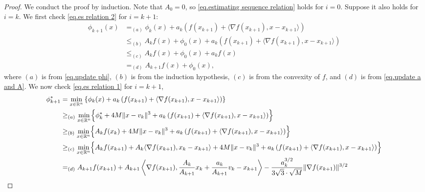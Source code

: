 \documentclass{article}
\begin{document}
\begin{proof}
    We conduct the proof by induction. Note that $A_0 = 0$, so \eqref{eq.estimating sequence relation} holds for $i=0$. Suppose it also holds for $i=k$.
    We first check \eqref{eq.es relation 2} for $i=k+1$:
    \begin{align*}
        \phi_{k+1}(x) & =_{(a)}\phi_k(x)+a_k\left(f(x_{k+1})+\langle \nabla f(x_{k+1}),x-x_{k+1}\rangle \right)               \\
                      & \leq_{(b)} A_k f(x)+\phi_0(x) +a_k\left(f(x_{k+1})+\langle \nabla f(x_{k+1}),x-x_{k+1}\rangle \right) \\
                      & \leq_{(c)} A_k f(x)+\phi_0(x) +a_k f(x)                                                               \\
                      & =_{(d)}A_{k+1} f(x)+\phi_0(x),
    \end{align*}
    where $(a)$ is from \eqref{eq.update phi}, $(b)$ is from the induction hypothesis, $(c)$ is from the convexity of $f$, and $(d)$ is from \eqref{eq.update a and A}.
    We now check \eqref{eq.es relation 1} for $i=k+1$,
    \begin{align*}
        \phi_{k+1}^*
         & = \min_{x\in\mathbb{R}^n} \left\{ \phi_k(x) + a_k \left(f(x_{k+1}) + \langle \nabla f(x_{k+1}), x - x_{k+1} \rangle \right) \right\}                                                                                        \\
         & \geq_{(a)} \min_{x\in\mathbb{R}^n} \Bigl\{ \phi_k^* + 4M \|x - v_k\|^3
        + a_k \left(f(x_{k+1}) + \langle \nabla f(x_{k+1}), x - x_{k+1} \rangle \right) \Bigr\}                                                                                                                                        \\
         & \geq_{(b)} \min_{x\in\mathbb{R}^n} \Bigl\{ A_k f(x_k) + 4M \|x - v_k\|^3
        + a_k \left(f(x_{k+1}) + \langle \nabla f(x_{k+1}), x - x_{k+1} \rangle \right) \Bigr\}                                                                                                                                        \\
         & \geq_{(c)} \min_{x\in\mathbb{R}^n} \Bigl\{ A_k f(x_{k+1}) + A_k \langle \nabla f(x_{k+1}), x_k - x_{k+1} \rangle + 4M \|x - v_k\|^3 + a_k \left(f(x_{k+1}) + \langle \nabla f(x_{k+1}), x - x_{k+1} \rangle \right) \Bigr\} \\
         & =_{(d)} A_{k+1} f(x_{k+1})
        + A_{k+1} \left\langle \nabla f(x_{k+1}),
        \frac{A_k}{A_{k+1}} x_k + \frac{a_k}{A_{k+1}} v_k - x_{k+1} \right\rangle - \frac{a_k^{3/2}}{3\sqrt{3} \cdot \sqrt{M}} \|\nabla f(x_{k+1})\|^{3/2}                                                                             \\

\end{align*}
\end{proof}
\end{document}

